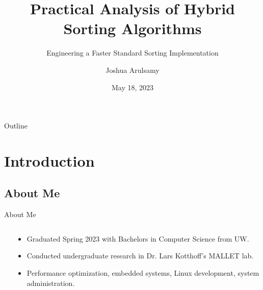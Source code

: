 \documentclass[13pt]{beamer}
\title{Practical Analysis of Hybrid Sorting Algorithms}
\subtitle{Engineering a Faster Standard Sorting Implementation}
\author{Joshua Arulsamy}
\date{May 18, 2023}
\begin{document}
\logo{}
\nocite{*}

\begin{frame}
	\titlepage
\end{frame}

\section{}
\subsection{}
\begin{frame}{Outline}
	\tableofcontents[hideallsubsections]
\end{frame}

\section{Introduction}
\subsection{About Me}
\begin{frame}{About Me}
	\begin{columns}
		\begin{column}{0.5\textwidth}
			\centering
		\end{column}

		\begin{column}{0.5\textwidth}
			\begin{itemize}
				\item Graduated Spring 2023 with Bachelors in Computer Science from
				      UW.
				\item Conducted undergraduate research in Dr. Lars Kotthoff's MALLET
				      lab.
				\item Performance optimization, embedded systems, Linux
				      development, system administration.
			\end{itemize}
		\end{column}
	\end{columns}
\end{frame}
\end{document}
